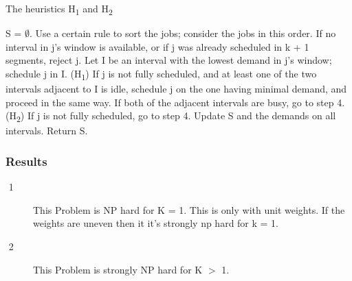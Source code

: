 \documentclass[11pt]{article}
\begin{document}
{		\phantom{This text will be invisible}
		\begin{algorithm}
			\caption{The heuristics H\textsubscript{1} and H\textsubscript{2}}
			\begin{algorithmic}[1]
				\STATE S = $\emptyset$.
				\STATE Use a certain rule to sort the jobs; consider the jobs in this order.
				\STATE If no interval in j’s window is available, or if j was already scheduled in k + 1 segments, reject j.
				\STATE Let I be an interval with the lowest demand in j's window; schedule j in I.
				\STATE (H\textsubscript{1}) If j is not fully scheduled, and at least one of the two intervals adjacent to I is idle, schedule j on the one having minimal demand, and proceed in the same way. If both of the adjacent intervals are busy, go to step 4.\\(H\textsubscript{2}) If j is not fully scheduled, go to step 4.
				\STATE Update S and the demands on all intervals.
				\ENDFOR
				\STATE Return S.
			\end{algorithmic}
		\end{algorithm}
		\phantom{This text will be invisible}
		\subsubsection{Results}
		\begin{description}
			\item[$$ 1]  This Problem is NP hard for K = 1. This is only with unit weights. If the weights are uneven then it it's strongly np hard for k = 1. \citet{doi:10.1137/1.9781611974317.11}
			\item[$$ 2] This Problem is strongly NP hard for K $>$ 1. \citet{doi:10.1137/1.9781611974317.11}
		\end{description}
}
\end{document}
